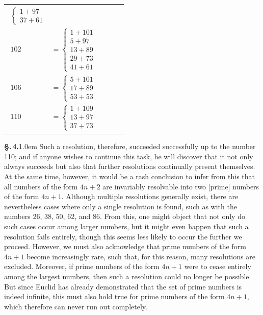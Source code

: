 \documentclass[12pt]{article}
\newcommand{\pnum}[1]{\textbf{\S.\,#1.}\kern1.0em}
\begin{document}
\begin{tabular}{l|l|l|l}
{\begin{align*}
\begin{cases}
           1 + 97 \\ 37 + 61
        \end{cases} \\
        102 &= \begin{cases}
           1 + 101 \\ 5 + 97 \\ 13 + 89 \\ 29 + 73 \\ 41 + 61
        \end{cases} \\
        106 &= \begin{cases}
           5 + 101 \\ 17 + 89 \\ 53 + 53
        \end{cases} \\
        110 &= \begin{cases}
           1 + 109 \\ 13 + 97 \\ 37 + 73
        \end{cases}
    \end{align*}}
\end{tabular}

\vspace{1cm}

\pnum{4} Such a resolution, therefore, succeeded successfully up to the number 110; and if anyone wishes to continue this task, he will discover that it not only always succeeds but also that further resolutions continually present themselves. At the same time, however, it would be a rash conclusion to infer from this that all numbers of the form $4n + 2$ are invariably resolvable into two [prime] numbers of the form $4n + 1$. Although multiple resolutions generally exist, there are nevertheless cases where only a single resolution is found, such as with the numbers 26, 38, 50, 62, and 86. From this, one might object that not only do such cases occur among larger numbers, but it might even happen that such a resolution fails entirely, though this seems less likely to occur the further we proceed. However, we must also acknowledge that prime numbers of the form $4n + 1$ become increasingly rare, such that, for this reason, many resolutions are excluded. Moreover, if prime numbers of the form $4n + 1$ were to cease entirely among the largest numbers, then such a resolution could no longer be possible. But since Euclid has already demonstrated that the set of prime numbers is indeed infinite, this must also hold true for prime numbers of the form $4n + 1$, which therefore can never run out completely.\\
\end{document}
